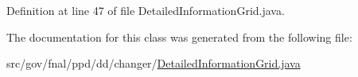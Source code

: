 Definition at line 47 of file Detailed\-Information\-Grid.\-java.



The documentation for this class was generated from the following file\-:\begin{DoxyCompactItemize}
\item 
src/gov/fnal/ppd/dd/changer/\hyperlink{DetailedInformationGrid_8java}{Detailed\-Information\-Grid.\-java}\end{DoxyCompactItemize}
